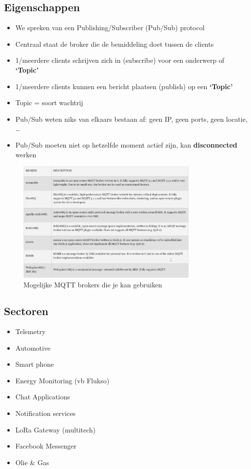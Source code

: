 \documentclass{article}
\newcommand{\bold}[1]{\textbf{#1}}
\begin{document}
\subsection{Eigenschappen}

\begin{itemize}
    \item We spreken van een Publishing/Subscriber (Pub/Sub) protocol
    \item Centraal staat de broker die de bemiddeling doet tussen de clients
    \item 1/meerdere clients schrijven zich in (subscribe) voor een onderwerp of \bold{`Topic'}
    \item 1/meerdere clients kunnen een bericht plaatsen (publish) op een \bold{`Topic'}
    \item Topic = soort wachtrij
    \item Pub/Sub weten niks van elkaars bestaan af: geen IP, geen ports, geen locatie, \dots
    \item Pub/Sub moeten niet op hetzelfde moment actief zijn, kan \bold{disconnected} werken
\end{itemize}


\begin{figure}[H]
    \centering
    \includegraphics[width=0.8\textwidth]{mqtt-brokers.png}
    \caption{Mogelijke MQTT brokers die je kan gebruiken}
\end{figure}

\subsection{Sectoren}

\begin{itemize}
    \item Telemetry
    \item Automotive
    \item Smart phone
    \item Energy Monitoring (vb Flukso)
    \item Chat Applications
    \item Notification services
    \item LoRa Gateway (multitech)
    \item Facebook Messenger
    \item Olie \& Gas
\end{itemize}
\end{document}
